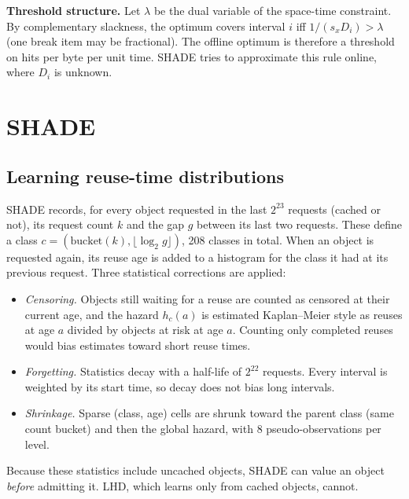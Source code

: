 \documentclass[conference]{IEEEtran}
\begin{document}
\textbf{Threshold structure.} Let $\lambda$ be the dual variable of the space-time constraint. By complementary
slackness, the optimum covers interval $i$ iff $1/(s_x D_i) > \lambda$ (one break item may be fractional). The
offline optimum is therefore a threshold on hits per byte per unit time. SHADE tries to approximate this rule
online, where $D_i$ is unknown.

\section{SHADE}
\subsection{Learning reuse-time distributions}
SHADE records, for every object requested in the last $2^{23}$ requests (cached or not), its request count $k$ and
the gap $g$ between its last two requests. These define a class $c=(\mathrm{bucket}(k),\lfloor\log_2 g\rfloor)$,
208 classes in total. When an object is requested again, its reuse age is added to a histogram for the class it
had at its previous request. Three statistical corrections are applied:
\begin{itemize}
\item \emph{Censoring.} Objects still waiting for a reuse are counted as censored at their current age, and the
hazard $h_c(a)$ is estimated Kaplan--Meier style as reuses at age $a$ divided by objects at risk at age $a$.
Counting only completed reuses would bias estimates toward short reuse times.
\item \emph{Forgetting.} Statistics decay with a half-life of $2^{22}$ requests. Every interval is weighted by its
start time, so decay does not bias long intervals.
\item \emph{Shrinkage.} Sparse (class, age) cells are shrunk toward the parent class (same count bucket) and then the
global hazard, with 8 pseudo-observations per level.
\end{itemize}
Because these statistics include uncached objects, SHADE can value an object \emph{before} admitting it. LHD, which
learns only from cached objects, cannot.
\end{document}
